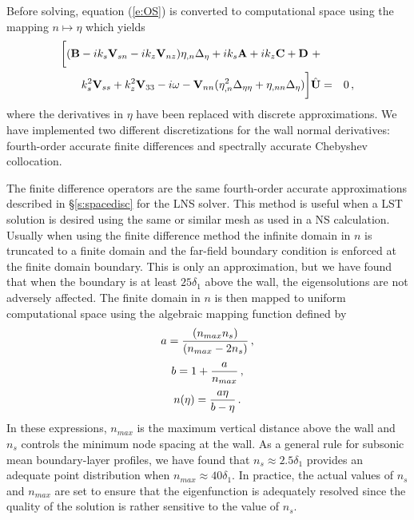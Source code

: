 %
%

Before solving, equation (\ref{e:OS}) is converted to computational space
using the mapping $n \mapsto \eta$ which yields
%
\begin{eqnarray} \label{e:dOS}
  \bigg[ 
  ({\bf B} - i k_s {{\bf V}_{sn}} - i k_z {{\bf V}_{nz}} ) \eta_{,n} \Delta_{\eta} + 
  i k_s {\bf A} + i k_z {\bf C} + {\bf D} \ + & & \nonumber \\
  k_s^2 {{\bf V}_{ss}} + k_z^2 {{\bf V}_{33}} - i \omega - {{\bf V}_{nn}} ( \eta_{,n}^2 
  \Delta_{\eta\eta} + \eta_{,nn} \Delta_{\eta} ) 
  \bigg] {\hat{\bf U}} &=& 0 {\, ,}
\end{eqnarray}
%
where the derivatives in $\eta$ have been replaced with discrete
approximations.  We have implemented two different discretizations for the
wall normal derivatives: fourth-order accurate finite differences and
spectrally accurate Chebyshev collocation.

The finite difference operators are the same fourth-order accurate
approximations described in \S\ref{s:spacedisc} for the LNS solver.  This
method is useful when a LST solution is desired using the same or similar mesh
as used in a NS calculation.  Usually when using the finite difference method
the infinite domain in $n$ is truncated to a finite domain and the far-field
boundary condition is enforced at the finite domain boundary.  This is only an
approximation, but we have found that when the boundary is at least $25
\delta_1$ above the wall, the eigensolutions are not adversely affected.  The
finite domain in $n$ is then mapped to uniform computational space using the
algebraic mapping function defined by
%
\begin{equation}  
  a = {{(n_{max} n_s)}\over{(n_{max} - 2 n_s)}} {\, ,}
\end{equation}
\begin{equation}
  b = 1 + {a \over n_{max}} {\, ,}
\end{equation}
\begin{equation}  \label{e:tsmap}
  n(\eta) = {{a \eta}\over{b - \eta}} {\, .}
\end{equation}
%
In these expressions, $n_{max}$ is the maximum vertical distance above the
wall and $n_s$ controls the minimum node spacing at the wall.  As a general
rule for subsonic mean boundary-layer profiles, we have found that $n_s
\approx 2.5 \delta_1$ provides an adequate point distribution when $n_{max}
\approx 40 \delta_1$.  In practice, the actual values of $n_s$ and $n_{max}$
are set to ensure that the eigenfunction is adequately resolved since the
quality of the solution is rather sensitive to the value of $n_s$.

